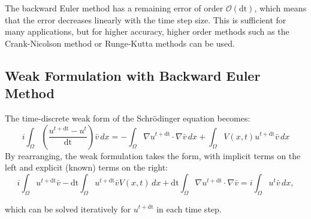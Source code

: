 \documentclass{article}
\theoremstyle{definition}
\theoremstyle{plain}
\theoremstyle{remark}
\newcommand{\dt}{\text{dt}}
\begin{document}
The backward Euler method has a remaining error of order $\mathcal{O}(\dt)$, which means that the error decreases linearly with the time step size. 
This is sufficient for many applications, but for higher accuracy, higher order methods such as the Crank-Nicolson method or Runge-Kutta methods can be used.


\subsection*{Weak Formulation with Backward Euler Method}
The time-discrete weak form of the Schrödinger equation becomes:
\begin{equation}
    i \int_{\Omega} \left( \frac{u^{t + \dt} - u^t}{\dt} \right) \bar{v} \, dx = - \int_{\Omega} \nabla u^{t + \dt} \cdot \nabla \bar{v} \, dx + \int_{\Omega} V(x,t) u^{t+\dt} \bar{v} \, dx
\end{equation}
By rearranging, the  weak formulation takes the form, with implicit terms on the left and explicit (known) terms on the right:
\begin{equation}
    i \int_{\Omega} u^{t + \dt} \bar{v} - \dt \int_{\Omega}  u^{t+\dt} \bar{v} V(x,t)  \, dx + \dt \int_{\Omega} \nabla u^{t + \dt} \cdot \nabla \bar{v} = i \int_{\Omega} u^t \bar{v} \, dx ,
\end{equation}

which can be solved iteratively for $u^{t + \dt}$ in each time step.

\end{document}
